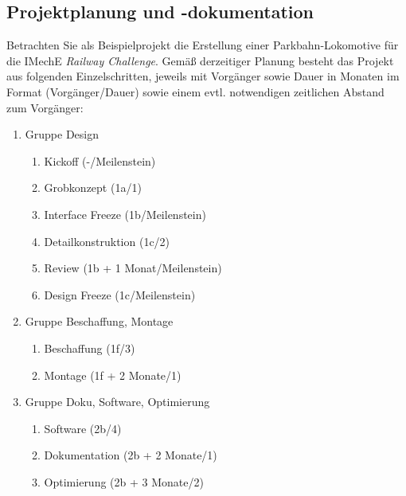 \documentclass[11pt,a4paper,addpoints]{exam}
\begin{document}
\begin{questions}
%	
\newpage
\section{Projektplanung und -dokumentation}
Betrachten Sie als Beispielprojekt die Erstellung einer Parkbahn-Lokomotive f\"ur die IMechE \textit{Railway Challenge}. Gem\"a{\ss} derzeitiger Planung besteht das Projekt aus folgenden Einzelschritten, jeweils mit Vorg\"anger sowie Dauer in Monaten im Format (Vorg\"anger/Dauer) sowie einem evtl. notwendigen zeitlichen Abstand zum Vorg\"anger:
	\begin{enumerate}
		\item Gruppe Design
		\begin{enumerate}
		\item Kickoff (-/Meilenstein)
		\item Grobkonzept (1a/1)
		\item Interface Freeze (1b/Meilenstein)
		\item Detailkonstruktion (1c/2)
		\item Review (1b + 1 Monat/Meilenstein)
		\item Design Freeze (1c/Meilenstein)
		\end{enumerate}
		\item Gruppe Beschaffung, Montage
		\begin{enumerate}
		\item Beschaffung (1f/3)
		\item Montage (1f + 2 Monate/1)
		\end{enumerate}
		\item Gruppe Doku, Software, Optimierung
		\begin{enumerate}
		\item Software (2b/4)
		\item Dokumentation (2b + 2 Monate/1)
		\item Optimierung (2b + 3 Monate/2)
		\end{enumerate}
	\end{enumerate}


\end{questions}
\end{document}
